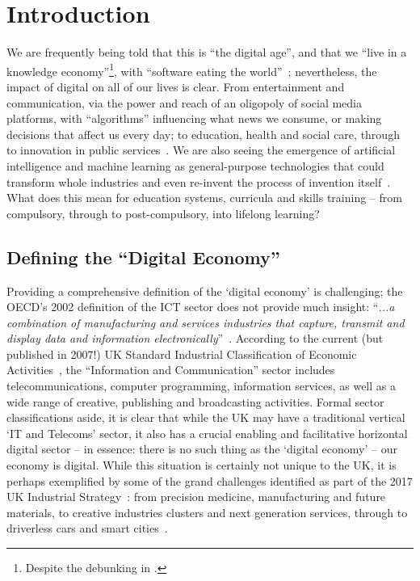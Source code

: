 \documentclass[sigconf,anonymous]{acmart}
\begin{document}
\section{Introduction}


We are frequently being told that this is ``the digital age'', and
that we ``live in a knowledge economy''\footnote{Despite the debunking
in \cite{Friesen2008}.}, with ``software eating the
world''~\cite{andreessen:2011}; nevertheless, the impact of digital on
all of our lives is clear. From entertainment and communication, via
the power and reach of an oligopoly of social media platforms, with
``algorithms'' influencing what news we consume, or making decisions
that affect us every day; to education, health and social care,
through to innovation in public services~\cite{ecdsmsuk:2018}. We are
also seeing the emergence of artificial intelligence and machine
learning as general-purpose technologies that could transform whole
industries and even re-invent the process of invention
itself~\cite{brynjolfsson-et-al:2018}. What does this mean for
education systems, curricula and skills training -- from compulsory,
through to post-compulsory, into lifelong learning?

\subsection{Defining the ``Digital Economy''}

Providing a comprehensive definition of the `digital economy' is
challenging; the OECD's 2002 definition of the ICT sector does not
provide much insight: ``{\emph{...a combination of manufacturing and
services industries that capture, transmit and display data and
information electronically}}''~\cite{oecd:2002}.  According to the
current (but published in 2007!) UK Standard Industrial Classification
of Economic Activities~\cite{onssic:2009}, the ``Information and
Communication'' sector includes telecommunications, computer
programming, information services, as well as a wide range of
creative, publishing and broadcasting activities. Formal sector
classifications aside, it is clear that while the UK may have a
traditional vertical `IT and Telecoms' sector, it also has a crucial
enabling and facilitative horizontal digital sector -- in essence:
there is no such thing as the `digital economy' -- our economy is
digital. While this situation is certainly not unique to the UK, it is
perhaps exemplified by some of the grand challenges identified as part
of the 2017 UK Industrial Strategy~\cite{ukis:2017}: from precision
medicine, manufacturing and future materials, to creative industries
clusters and next generation services, through to driverless cars and
smart cities~\cite{tryfonas+crick:petra2018}.
\end{document}
